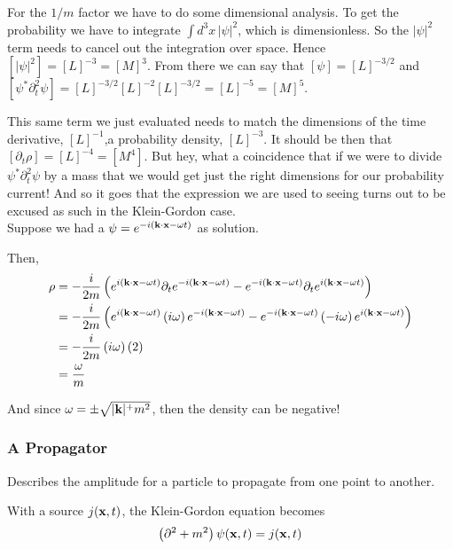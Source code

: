 For the $1/m$ factor we have to do some dimensional analysis.
To get the probability we have to integrate $\int d^3x \, |\psi|^2$, which is dimensionless.
So the $|\psi|^2$ term needs to cancel out the integration over space.
Hence $[|\psi|^2] = [L]^{-3} = [M]^{3}$.
From there we can say that $[\psi] = [L]^{-3/2}$ and
$[\psi^* \partial_{t}^2 \psi] = [L]^{-3/2}[L]^{-2}[L]^{-3/2} = [L]^{-5} = [M]^{5}$.

This same term we just evaluated needs to match the dimensions of
the time derivative, $[L]^{-1}$,a probability density, $[L]^{-3}$.
It should be then that $[\partial_t \rho] = [L]^{-4} = [M^4]$.
But hey, what a coincidence that if we were to divide $\psi^* \partial_{t}^2 \psi$ by a mass
that we would get just the right dimensions for our probability current!
And so it goes that the expression we are used to seeing turns out to be excused as such in the Klein-Gordon case.
\\


Suppose we had a $\psi =  e^{-i(\boldsymbol{\mathbf{k}}\cdot\boldsymbol{\mathbf{x}} -\omega t)}$ as solution.

Then,
\begin{align*}
\rho &=
    -\frac{i}{2m} \left( 
        e^{i(\boldsymbol{\mathbf{k}}\cdot\boldsymbol{\mathbf{x}} -\omega t)} \partial_t e^{-i(\boldsymbol{\mathbf{k}}\cdot\boldsymbol{\mathbf{x}} -\omega t)} -
        e^{-i(\boldsymbol{\mathbf{k}}\cdot\boldsymbol{\mathbf{x}} -\omega t)} \partial_t e^{i(\boldsymbol{\mathbf{k}}\cdot\boldsymbol{\mathbf{x}} -\omega t)} 
    \right) \\
&= -\frac{i}{2m} \left(
    e^{i(\boldsymbol{\mathbf{k}}\cdot\boldsymbol{\mathbf{x}} -\omega t)} \left(i\omega\right) e^{-i(\boldsymbol{\mathbf{k}}\cdot\boldsymbol{\mathbf{x}} -\omega t)} -
    e^{-i(\boldsymbol{\mathbf{k}}\cdot\boldsymbol{\mathbf{x}} -\omega t)} \left(-i\omega\right) e^{i(\boldsymbol{\mathbf{k}}\cdot\boldsymbol{\mathbf{x}} -\omega t)}
    \right) \\
&= -\frac{i}{2m} \left(i\omega\right) \left( 2 \right) \\
&= \frac{\omega}{m}
\end{align*}

And since $\omega = \pm \sqrt{|\boldsymbol{\mathbf{k}}|^ + m^2}$, then the density can be negative!



\subsubsection{A Propagator}

Describes the amplitude for a particle to propagate from one point to another.

With a source $j(\boldsymbol{\mathbf{x}}, t)$, the Klein-Gordon equation becomes
$$
\left( \partial^2 + m^2 \right) \psi(\boldsymbol{\mathbf{x}}, t) = j(\boldsymbol{\mathbf{x}}, t)
$$

